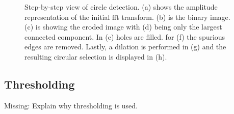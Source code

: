 \documentclass{article}
\begin{document}
\begin{figure}[!htb]
\begin{subfigure}[b]{0.24\textwidth}
                \caption{}
                \label{fig:mouse}
        \end{subfigure}
        \caption{Step-by-step view of circle detection. (a) shows the amplitude representation of the initial fft transform.
(b) is the binary image.
(c) is showing the eroded image with (d) being only the largest connected component.
In (e) holes are filled. for (f) the spurious edges are removed.
Lastly, a dilation is performed in (g) and the resulting circular selection is displayed in (h).}\label{fig:lowpass}
\end{figure}

\subsection{Thresholding}\label{sec:Thresholding}
Missing: Explain why thresholding is used.
\end{document}
